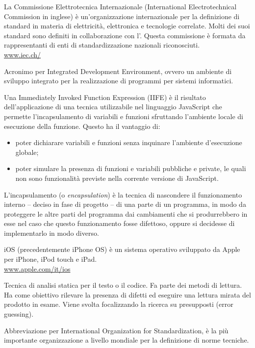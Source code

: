 La Commissione Elettrotecnica Internazionale (International Electrotechnical Commission in inglese) è un'organizzazione internazionale per la definizione di standard in materia di elettricità, elettronica e tecnologie correlate. Molti dei suoi standard sono definiti in collaborazione con l'. Questa commissione è formata da rappresentanti di enti di standardizzazione nazionali riconosciuti.\\
\url{www.iec.ch/}

Acronimo per Integrated Development Environment, ovvero un ambiente di sviluppo integrato per la realizzazione di programmi per sistemi informatici.

Una Immediately Invoked Function Expression (IIFE) è il risultato dell'applicazione di una tecnica utilizzabile nel linguaggio JavaScript che permette l'incapsulamento di variabili e funzioni sfruttando l'ambiente locale di esecuzione della funzione. Questo ha il vantaggio di:
\begin{itemize}
  \item poter dichiarare variabili e funzioni senza inquinare l'ambiente d'esecuzione globale; 
  \item poter simulare la presenza di funzioni e variabili pubbliche e private, le quali non sono funzionalità previste nella corrente versione di JavaScript.
\end{itemize}

L'incapsulamento (o \textit{encapsulation}) è la tecnica di nascondere il funzionamento interno – deciso in fase di progetto – di una parte di un programma, in modo da proteggere le altre parti del programma dai cambiamenti che si produrrebbero in esse nel caso che questo funzionamento fosse difettoso, oppure si decidesse di implementarlo in modo diverso.

iOS (precedentemente iPhone OS) è un sistema operativo sviluppato da Apple per iPhone, iPod touch e iPad.\\
\url{www.apple.com/it/ios}

Tecnica di analisi statica per il testo o il codice. Fa parte dei metodi di lettura. Ha come obiettivo rilevare la presenza di difetti ed eseguire una lettura mirata del prodotto in esame. Viene svolta focalizzando la ricerca su presupposti (error guessing).

Abbreviazione per International Organization for Standardization, è la più importante organizzazione a livello mondiale per la definizione di norme tecniche.
\clearpage
